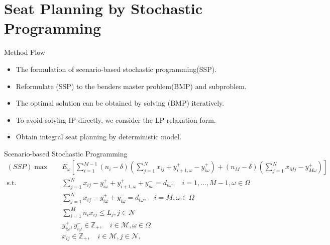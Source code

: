 
\section{Seat Planning by Stochastic Programming}
    \frame{\sectionpage}

    \begin{frame}{Method Flow}
      \begin{itemize}
        \item The formulation of scenario-based stochastic programming(SSP).
        \item Reformulate (SSP) to the benders master problem(BMP) and subproblem.
        \item The optimal solution can be obtained by solving (BMP) iteratively.
        \item To avoid solving IP directly, we consider the LP relaxation form. 
        \item Obtain integral seat planning by deterministic model.
      \end{itemize}
    \end{frame}

    \begin{frame}{Scenario-based Stochastic Programming}
      \footnotesize
      \begin{equation}\label{sto_form}
        \begin{aligned}
       (SSP) \max \quad & E_{\omega}\left[\sum_{i=1}^{M-1} (n_i-\delta) (\sum_{j= 1}^{N} x_{ij} + y_{i+1,\omega}^{+} - y_{i \omega}^{+}) + (n_{M}-\delta) (\sum_{j= 1}^{N} x_{Mj} - y_{M \omega}^{+})\right] \\
        \text {s.t.} \quad & \sum_{j= 1}^{N} x_{ij}-y_{i \omega}^{+}+
        y_{i+1, \omega}^{+} + y_{i \omega}^{-}=d_{i \omega}, \quad i = 1,\ldots,M-1, \omega \in \Omega \\
        & \sum_{j= 1}^{N} x_{ij} -y_{i \omega}^{+}+y_{i \omega}^{-}=d_{i \omega}, \quad i = M, \omega \in \Omega \\
        & \sum_{i=1}^{M} n_{i} x_{ij} \leq L_j, j \in \mathcal{N}\\
        & y_{i \omega}^{+}, y_{i \omega}^{-} \in \mathbb{Z}_{+}, \quad i \in \mathcal{M}, \omega \in \Omega \\
        & x_{ij} \in \mathbb{Z}_{+}, \quad i \in \mathcal{M}, j \in \mathcal{N}.
        \end{aligned}
      \end{equation}
    \end{frame}

